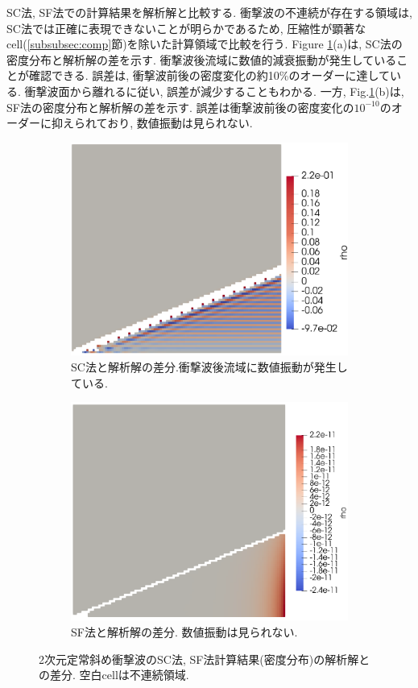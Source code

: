 \documentclass[a4j]{jarticle}
\begin{document}
SC法, SF法での計算結果を解析解と比較する.
衝撃波の不連続が存在する領域は, SC法では正確に表現できないことが明らかであるため,
圧縮性が顕著なcell(\ref{subsubsec:comp}節)を除いた計算領域で比較を行う.
Figure \ref{fig:2Ddiagcomp}(a)は, SC法の密度分布と解析解の差を示す.
衝撃波後流域に数値的減衰振動が発生していることが確認できる.
誤差は, 衝撃波前後の密度変化の約10\%のオーダーに達している.
衝撃波面から離れるに従い, 誤差が減少することもわかる.
一方, Fig.\ref{fig:2Ddiagcomp}(b)は, SF法の密度分布と解析解の差を示す.
誤差は衝撃波前後の密度変化の$10^{-10}$のオーダーに抑えられており, 数値振動は見られない.
\begin{figure}[h]
  \centering
  \begin{subfigure}[t]{0.45\textwidth}
    \centering
    \includegraphics[width=\linewidth]{2Ddiagcompa.pdf}
    \caption{SC法と解析解の差分.衝撃波後流域に数値振動が発生している. }
  \end{subfigure}
  \hfill
  \begin{subfigure}[b]{0.45\textwidth}
    \centering
    \includegraphics[width=\linewidth]{2Ddiagcompb.pdf}
    \caption{SF法と解析解の差分. 数値振動は見られない.}
  \end{subfigure}
  \caption{2次元定常斜め衝撃波のSC法, SF法計算結果(密度分布)の解析解との差分. 空白cellは不連続領域.}
  \label{fig:2Ddiagcomp}
\end{figure}
\end{document}
